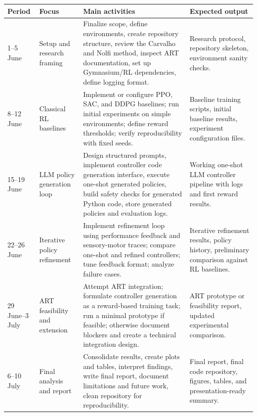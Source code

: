 \documentclass[12pt]{article}
\begin{document}
\begin{longtable}{p{2.2cm} p{3.0cm} p{5.2cm} p{4.0cm}}
\toprule
\textbf{Period} & \textbf{Focus} & \textbf{Main activities} & \textbf{Expected output} \\
\midrule
\endhead

1--5 June & Setup and research framing & Finalize scope, define environments, create repository structure, review the Carvalho and Nolfi method, inspect ART documentation, set up Gymnasium/RL dependencies, define logging format. & Research protocol, repository skeleton, environment sanity checks. \\

8--12 June & Classical RL baselines & Implement or configure PPO, SAC, and DDPG baselines; run initial experiments on simple environments; define reward thresholds; verify reproducibility with fixed seeds. & Baseline training scripts, initial baseline results, experiment configuration files. \\

15--19 June & LLM policy generation loop & Design structured prompts, implement controller code generation interface, execute one-shot generated policies, build safety checks for generated Python code, store generated policies and evaluation logs. & Working one-shot LLM controller pipeline with logs and first reward results. \\

22--26 June & Iterative policy refinement & Implement refinement loop using performance feedback and sensory-motor traces; compare one-shot and refined controllers; tune feedback format; analyze failure cases. & Iterative refinement results, policy history, preliminary comparison against RL baselines. \\

29 June--3 July & ART feasibility and extension & Attempt ART integration; formulate controller generation as a reward-based training task; run a minimal prototype if feasible; otherwise document blockers and create a technical integration design. & ART prototype or feasibility report, updated experimental comparison. \\

6--10 July & Final analysis and report & Consolidate results, create plots and tables, interpret findings, write final report, document limitations and future work, clean repository for reproducibility. & Final report, final code repository, figures, tables, and presentation-ready summary. \\

\bottomrule
\end{longtable}
\end{document}
